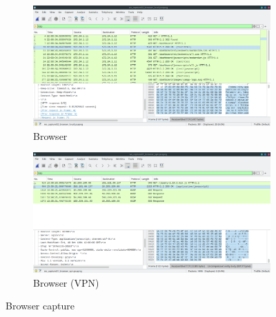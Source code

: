 \documentclass[11pt,a4paper]{report}
\begin{document}
\begin{flushleft}
\begin{flushleft}
                \begin{figure}[t]
                    \centering
                        \begin{subfigure}{0.49\linewidth} \centering
                            \includegraphics[scale=0.20]{phase1/images/wscapwcsocket08} %
                            \caption{Browser} \label{fig:wireshark4}
                        \end{subfigure}
                        \begin{subfigure}{0.49\linewidth} \centering
                            \includegraphics[scale=0.20]{phase1/images/wscapwcsocket07} %
                            \caption{Browser (VPN)} \label{fig:wireshark3}
                        \end{subfigure}
                    \caption{Browser capture} \label{fig:twobrowsers}
                    \end{figure}


\end{flushleft}
\end{flushleft}
\end{document}
